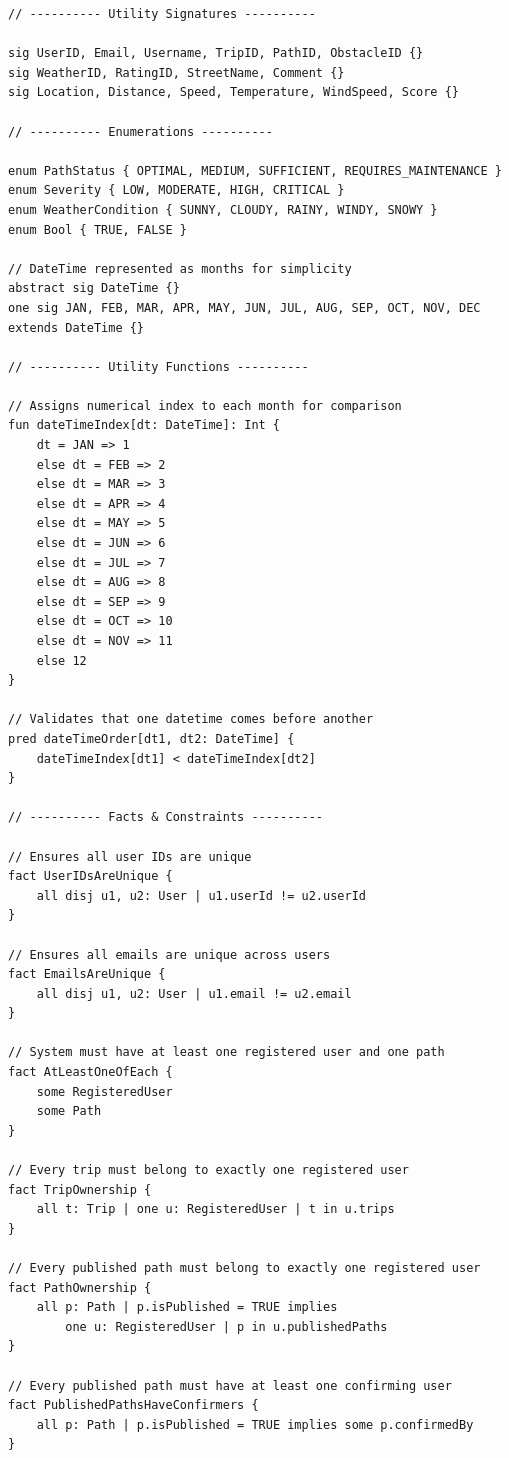 \begin{lstlisting}
// ---------- Utility Signatures ----------

sig UserID, Email, Username, TripID, PathID, ObstacleID {}
sig WeatherID, RatingID, StreetName, Comment {}
sig Location, Distance, Speed, Temperature, WindSpeed, Score {}

// ---------- Enumerations ----------

enum PathStatus { OPTIMAL, MEDIUM, SUFFICIENT, REQUIRES_MAINTENANCE }
enum Severity { LOW, MODERATE, HIGH, CRITICAL }
enum WeatherCondition { SUNNY, CLOUDY, RAINY, WINDY, SNOWY }
enum Bool { TRUE, FALSE }

// DateTime represented as months for simplicity
abstract sig DateTime {}
one sig JAN, FEB, MAR, APR, MAY, JUN, JUL, AUG, SEP, OCT, NOV, DEC extends DateTime {}

// ---------- Utility Functions ----------

// Assigns numerical index to each month for comparison
fun dateTimeIndex[dt: DateTime]: Int {
    dt = JAN => 1
    else dt = FEB => 2
    else dt = MAR => 3
    else dt = APR => 4
    else dt = MAY => 5
    else dt = JUN => 6
    else dt = JUL => 7
    else dt = AUG => 8
    else dt = SEP => 9
    else dt = OCT => 10
    else dt = NOV => 11
    else 12
}

// Validates that one datetime comes before another
pred dateTimeOrder[dt1, dt2: DateTime] {
    dateTimeIndex[dt1] < dateTimeIndex[dt2]
}

// ---------- Facts & Constraints ----------

// Ensures all user IDs are unique
fact UserIDsAreUnique {
    all disj u1, u2: User | u1.userId != u2.userId
}

// Ensures all emails are unique across users
fact EmailsAreUnique {
    all disj u1, u2: User | u1.email != u2.email
}

// System must have at least one registered user and one path
fact AtLeastOneOfEach {
    some RegisteredUser
    some Path
}

// Every trip must belong to exactly one registered user
fact TripOwnership {
    all t: Trip | one u: RegisteredUser | t in u.trips
}

// Every published path must belong to exactly one registered user
fact PathOwnership {
    all p: Path | p.isPublished = TRUE implies 
        one u: RegisteredUser | p in u.publishedPaths
}

// Every published path must have at least one confirming user
fact PublishedPathsHaveConfirmers {
    all p: Path | p.isPublished = TRUE implies some p.confirmedBy
}


\end{lstlisting}
